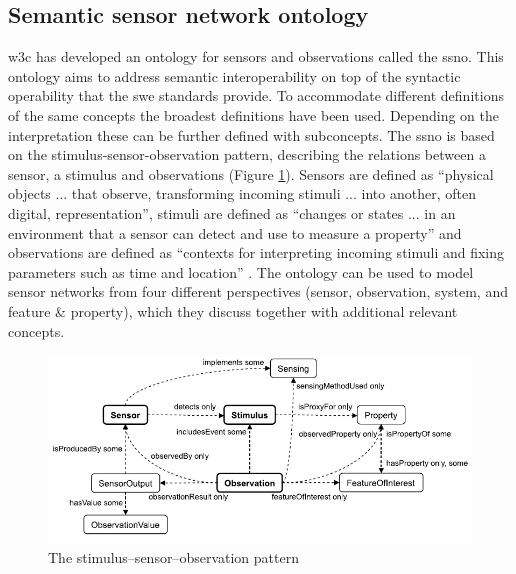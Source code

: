 \subsection{Semantic sensor network ontology} 
\ac{w3c} has developed an ontology for sensors and observations called the \ac{ssno}. This ontology aims to address semantic interoperability on top of the syntactic operability that the \ac{swe} standards provide. To accommodate different definitions of the same concepts the broadest definitions have been used. Depending on the interpretation these can be further defined with subconcepts. The \ac{ssno} is based on the stimulus-sensor-observation pattern, describing the relations between a sensor, a stimulus and observations (Figure \ref{fig:sens-stim-obs}). Sensors are defined as \enquote{physical objects ... that observe, transforming incoming stimuli ... into another, often digital, representation}, stimuli are defined as \enquote{changes or states ... in an environment that a sensor can detect and use to measure a property} and observations are defined as \enquote{contexts for interpreting incoming stimuli and fixing parameters such as time and location} \cite[p. 28]{SSW:SSN_incubatorGroup}. The ontology can be used to model sensor networks from four different perspectives (sensor, observation, system, and feature \& property), which they discuss together with additional relevant concepts.

\begin{figure}
	\centering
	\includegraphics[width=1\linewidth]{figs/sens_stim_obs.png}
	\caption{The stimulus–sensor–observation pattern \cite[p. 28]{SSW:SSN_incubatorGroup}}
	\label{fig:sens-stim-obs}
\end{figure}

